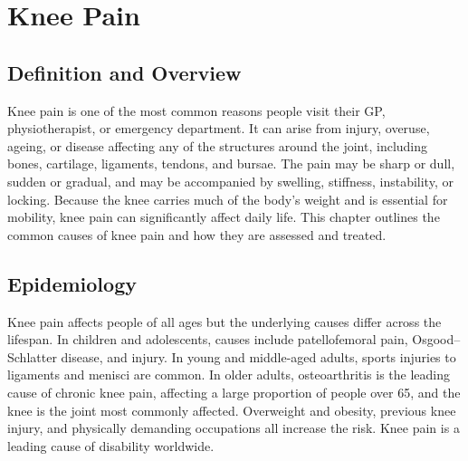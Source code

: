 \chapter{Knee Pain}

\section*{Definition and Overview}
Knee pain is one of the most common reasons people visit their GP, physiotherapist, or emergency department. It can arise from injury, overuse, ageing, or disease affecting any of the structures around the joint, including bones, cartilage, ligaments, tendons, and bursae. The pain may be sharp or dull, sudden or gradual, and may be accompanied by swelling, stiffness, instability, or locking. Because the knee carries much of the body's weight and is essential for mobility, knee pain can significantly affect daily life. This chapter outlines the common causes of knee pain and how they are assessed and treated.

\section*{Epidemiology}
Knee pain affects people of all ages but the underlying causes differ across the lifespan. In children and adolescents, causes include patellofemoral pain, Osgood--Schlatter disease, and injury. In young and middle-aged adults, sports injuries to ligaments and menisci are common. In older adults, osteoarthritis is the leading cause of chronic knee pain, affecting a large proportion of people over 65, and the knee is the joint most commonly affected. Overweight and obesity, previous knee injury, and physically demanding occupations all increase the risk. Knee pain is a leading cause of disability worldwide.


